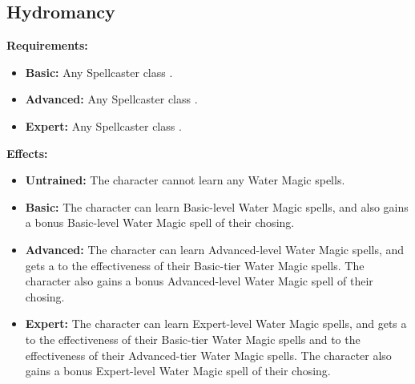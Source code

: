 \documentclass[openany,10pt,a4paper]{book}
\begin{document}
\subsection{Hydromancy}
\begin{table}[!ht]
\centering
{}
\end{table}
\textbf{Requirements:}
\begin{itemize}
	\item \textbf{Basic:} Any Spellcaster class .
	\item \textbf{Advanced:} Any Spellcaster class .
	\item \textbf{Expert:} Any Spellcaster class .
\end{itemize}
\textbf{Effects:}
\begin{itemize}
	\item \textbf{Untrained:} The character cannot learn any Water Magic spells.
	\item \textbf{Basic:} The character can learn Basic-level Water Magic spells, and also gains a bonus Basic-level Water Magic spell of their chosing.
	\item \textbf{Advanced:} The character can learn Advanced-level Water Magic spells, and gets a  to the effectiveness of their Basic-tier Water Magic spells. The character also gains a bonus Advanced-level Water Magic spell of their chosing.
	\item \textbf{Expert:} The character can learn Expert-level Water Magic spells, and gets a  to the effectiveness of their Basic-tier Water Magic spells and  to the effectiveness of their Advanced-tier Water Magic spells. The character also gains a bonus Expert-level Water Magic spell of their chosing.
\end{itemize}\newpage
\end{document}
